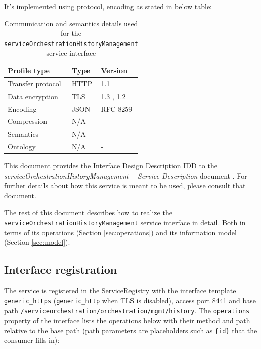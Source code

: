\documentclass[a4paper]{arrowhead}
\begin{document}
It's implemented using protocol, encoding as stated in below table:
\begin{table}[ht!]
  \centering
  \begin{tabular}{|l|l|l|}
    \hline
    \rowcolor{gray!33} Profile type & Type & Version \\ \hline
    Transfer protocol & HTTP & 1.1 \cite{rfc9112} \\ \hline
    Data encryption & TLS & 1.3 \cite{rfc8446}, 1.2 \cite{rfc5246} \\ \hline
    Encoding & JSON & RFC 8259 \cite{rfc8259} \\ \hline
    Compression & N/A & - \\ \hline
    Semantics & N/A & - \\ \hline
    Ontology & N/A & - \\ \hline
  \end{tabular}
  \caption{Communication and semantics details used for the \texttt{service\allowbreak{}Orchestration\allowbreak{}History\allowbreak{}Management} service interface}
  \label{tab:comunication_semantics_profile}
\end{table}

This document provides the Interface Design Description IDD to the \textit{serviceOrchestrationHistoryManagement -- Service Description} document \cite{dso-serviceOrchestrationHistoryManagement-sd}.
For further details about how this service is meant to be used, please consult that document.

The rest of this document describes how to realize the \texttt{service\allowbreak{}Orchestration\allowbreak{}History\allowbreak{}Management} service
interface in detail. Both in terms of its operations (Section \ref{sec:operations}) and its information model (Section \ref{sec:model}).

\subsection{Interface registration}

The service is registered in the ServiceRegistry with the interface template \texttt{generic\_\allowbreak{}https} (\texttt{generic\_\allowbreak{}http} when TLS is disabled), access port 8441 and base path \texttt{/\allowbreak{}serviceorchestration/\allowbreak{}orchestration/\allowbreak{}mgmt/\allowbreak{}history}. The \texttt{operations} property of the interface lists the operations below with their method and path relative to the base path (path parameters are placeholders such as \texttt{\{id\}} that the consumer fills in):
\end{document}
